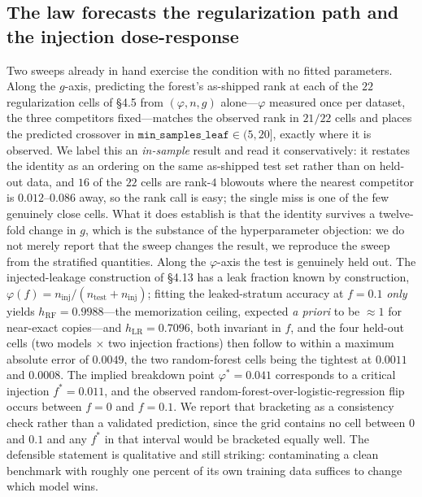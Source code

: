 \subsection{The law forecasts the regularization path and the injection dose-response}\label{sec:r-oos}
Two sweeps already in hand exercise the condition with no fitted parameters. Along the $g$-axis, predicting the forest's as-shipped rank at each of the $22$ regularization cells of \S4.5 from $(\varphi,n,g)$ alone---$\varphi$ measured once per dataset, the three competitors fixed---matches the observed rank in $21/22$ cells and places the predicted crossover in $\texttt{min\_samples\_leaf}\in(5,20]$, exactly where it is observed. We label this an \emph{in-sample} result and read it conservatively: it restates the identity as an ordering on the same as-shipped test set rather than on held-out data, and $16$ of the $22$ cells are rank-$4$ blowouts where the nearest competitor is $0.012$--$0.086$ away, so the rank call is easy; the single miss is one of the few genuinely close cells. What it does establish is that the identity survives a twelve-fold change in $g$, which is the substance of the hyperparameter objection: we do not merely report that the sweep changes the result, we reproduce the sweep from the stratified quantities. Along the $\varphi$-axis the test is genuinely held out. The injected-leakage construction of \S4.13 has a leak fraction known by construction, $\varphi(f)=n_{\mathrm{inj}}/(n_{\mathrm{test}}+n_{\mathrm{inj}})$; fitting the leaked-stratum accuracy at $f=0.1$ \emph{only} yields $h_{\mathrm{RF}}=0.9988$---the memorization ceiling, expected \emph{a priori} to be $\approx1$ for near-exact copies---and $h_{\mathrm{LR}}=0.7096$, both invariant in $f$, and the four held-out cells (two models $\times$ two injection fractions) then follow to within a maximum absolute error of $0.0049$, the two random-forest cells being the tightest at $0.0011$ and $0.0008$. The implied breakdown point $\varphi^{*}=0.041$ corresponds to a critical injection $f^{*}=0.011$, and the observed random-forest-over-logistic-regression flip occurs between $f=0$ and $f=0.1$. We report that bracketing as a consistency check rather than a validated prediction, since the grid contains no cell between $0$ and $0.1$ and any $f^{*}$ in that interval would be bracketed equally well. The defensible statement is qualitative and still striking: contaminating a clean benchmark with roughly one percent of its own training data suffices to change which model wins.

